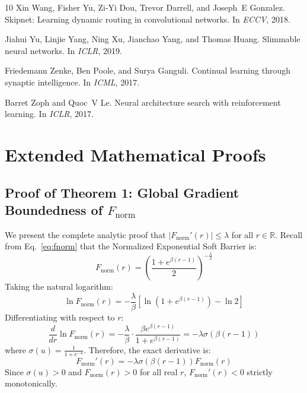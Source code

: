 \documentclass[11pt, a4paper]{article}
\begin{document}
\begin{thebibliography}{10}
Xin Wang, Fisher Yu, Zi-Yi Dou, Trevor Darrell, and Joseph~E Gonzalez.
\newblock Skipnet: Learning dynamic routing in convolutional networks.
\newblock In {\em ECCV}, 2018.

Jiahui Yu, Linjie Yang, Ning Xu, Jianchao Yang, and Thomas Huang.
\newblock Slimmable neural networks.
\newblock In {\em ICLR}, 2019.

Friedemann Zenke, Ben Poole, and Surya Ganguli.
\newblock Continual learning through synaptic intelligence.
\newblock In {\em ICML}, 2017.

Barret Zoph and Quoc~V Le.
\newblock Neural architecture search with reinforcement learning.
\newblock In {\em ICLR}, 2017.

\end{thebibliography}

\appendix

\section{Extended Mathematical Proofs}
\label{sec:appendix_proofs}

\subsection{Proof of Theorem 1: Global Gradient Boundedness of $F_{\text{norm}}$}
\label{sec:proof_theorem1}

We present the complete analytic proof that $|F_{\text{norm}}'(r)| \le \lambda$ for all $r \in \mathbb{R}$. Recall from Eq.~\eqref{eq:fnorm} that the Normalized Exponential Soft Barrier is:
\begin{equation}
    F_{\text{norm}}(r) = \left(\frac{1 + e^{\beta(r - 1)}}{2}\right)^{-\frac{\lambda}{\beta}}
\end{equation}
Taking the natural logarithm:
\begin{equation}
    \ln F_{\text{norm}}(r) = -\frac{\lambda}{\beta} \left[ \ln\left(1 + e^{\beta(r - 1)}\right) - \ln 2 \right]
\end{equation}
Differentiating with respect to $r$:
\begin{equation}
    \frac{d}{dr} \ln F_{\text{norm}}(r) = -\frac{\lambda}{\beta} \cdot \frac{\beta e^{\beta(r - 1)}}{1 + e^{\beta(r - 1)}} = -\lambda \sigma(\beta(r - 1))
\end{equation}
where $\sigma(u) = \frac{1}{1 + e^{-u}}$. Therefore, the exact derivative is:
\begin{equation}
    F_{\text{norm}}'(r) = -\lambda \sigma(\beta(r - 1)) F_{\text{norm}}(r)
\end{equation}
Since $\sigma(u) > 0$ and $F_{\text{norm}}(r) > 0$ for all real $r$, $F_{\text{norm}}'(r) < 0$ strictly monotonically.
\end{document}
